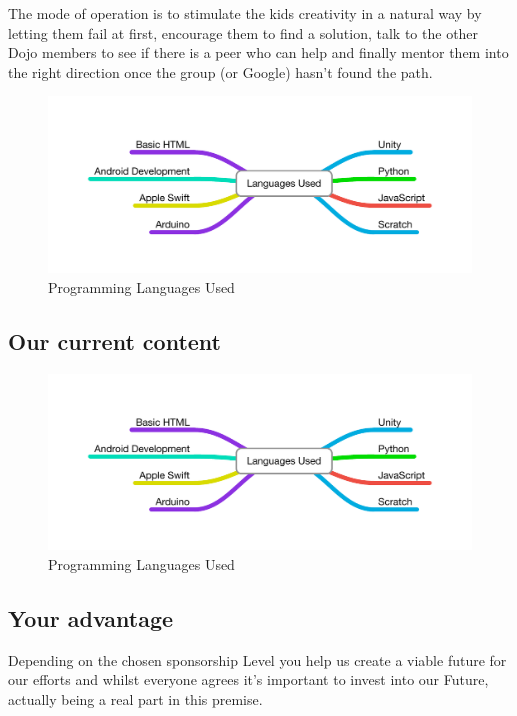 \documentclass{proposal}
\begin{document}
The mode of operation is to stimulate the kids creativity in a natural way by letting them fail at first, encourage them to find a solution, talk to the other Dojo members to see if there is a peer who can help and finally mentor them into the right direction once the group (or Google) hasn't found the path.

\begin{figure}[h]
        \centering
                \centering
	  \includegraphics[scale=0.7]{images/LanguagesUsed}
                \caption{Programming Languages Used}
                \label{fig:gull}
\end{figure}

\subsection*{Our current content}
\begin{figure}[h]
        \centering
                \centering
	  \includegraphics[scale=0.8]{images/LanguagesUsed}
                \caption{Programming Languages Used}
                \label{fig:gull}
\end{figure}


\subsection*{Your advantage}
Depending on the chosen sponsorship Level you help us create a viable future for our efforts and whilst everyone agrees it's important to invest into our Future, actually being a real part in this premise.
\end{document}
